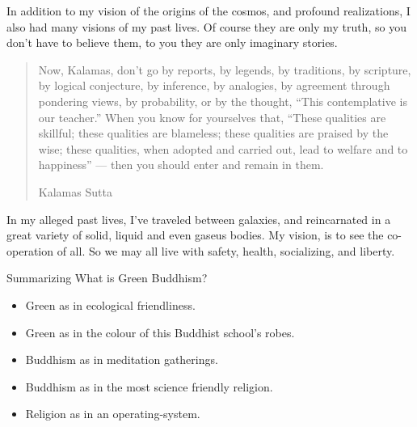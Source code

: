 In addition to my vision of the origins of the cosmos, and profound
realizations, I also had many visions of my past lives. Of course they are only
my truth, so you don't have to believe them, to you they are only imaginary
stories. 


\blockquote[Kalamas Sutta\cite{kalamas}]{Now, Kalamas, don't go by reports, by legends, by traditions, 
by scripture, by logical conjecture, by inference, by analogies, by agreement 
through pondering views, by probability, or by the thought, ``This contemplative
 is our teacher.'' When you know for yourselves that, ``These qualities are 
skillful; these qualities are blameless; these qualities are praised by the 
wise; these qualities, when adopted and carried out, lead to welfare and 
to happiness'' — then you should enter and remain in them.
}

In my alleged past lives, I've traveled between galaxies, and reincarnated in a
great variety of solid, liquid and even gaseus bodies. My vision, is to see the
co-operation of all. So we may all live with safety, health, socializing, and
liberty. 

Summarizing What is Green Buddhism?
\begin{itemize}
  \item Green as in ecological friendliness.
  \item Green as in the colour of this Buddhist school's robes. 
  \item Buddhism as in meditation gatherings. 
  \item Buddhism as in the most science friendly
religion\cite{kalamas}\cite{singleAtom}. 
  \item Religion as in an operating-system.
\end{itemize}

